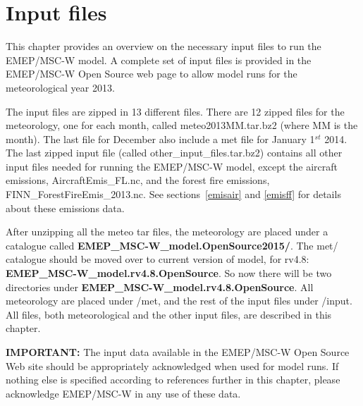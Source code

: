 \chapter{Input files}
\label{ch:InputFiles}

This chapter provides an overview on the necessary input files to run the 
EMEP/MSC-W model. A complete set of input files is provided in the EMEP/MSC-W 
Open Source web page to allow model runs for the meteorological year 2013. 

The input files are zipped in 13 different files. There are 12 zipped files 
for the meteorology, one for each month, called meteo2013MM.tar.bz2 (where MM 
is the month). 
The last file for December also include a met file for January 1$^{st}$ 2014. 
The last zipped input file (called other\_input\_files.tar.bz2) contains all 
other input files needed for running the EMEP/MSC-W model, except the aircraft emissions,
AircraftEmis\_FL.nc, and the forest fire emissions, FINN\_ForestFireEmis\_2013.nc. See sections~\ref{emisair} and \ref{emisff} for details about these emissions data.

After unzipping all the meteo tar files, the meteorology are placed under a
catalogue called {\bf EMEP\_MSC-W\_model.OpenSource2015/}. The met/
catalogue should be moved over to current version of model, for rv4.8:
{\bf EMEP\_MSC-W\_model.rv4.8.OpenSource}. 
So now there will be two directories under 
{\bf EMEP\_MSC-W\_model.rv4.8.OpenSource}. 
All meteorology are placed under /met, and the rest of the input files under 
/input. 
All files, both meteorological and the other input files, are described in 
this chapter.

{\bf IMPORTANT:} The input data available in the EMEP/MSC-W Open Source Web
site should be appropriately acknowledged when used for model runs.
If nothing else is specified according to references further in this
chapter, please acknowledge EMEP/MSC-W in any use of these data.

